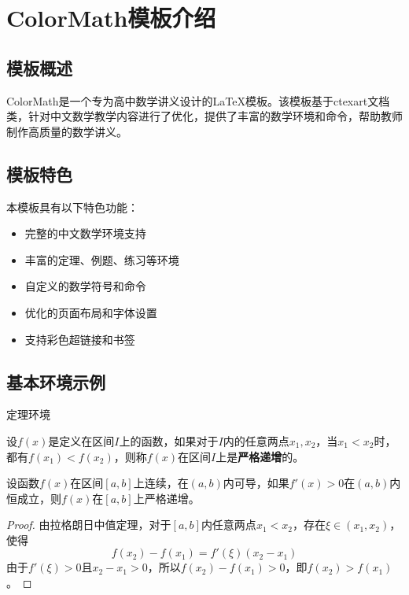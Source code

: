 \documentclass[fancy]{ColorMath} %
\begin{document}
\maketitle
\tableofcontents

\section{ColorMath模板介绍}

\subsection{模板概述}

ColorMath是一个专为高中数学讲义设计的\LaTeX{}模板。该模板基于ctexart文档类，针对中文数学教学内容进行了优化，提供了丰富的数学环境和命令，帮助教师制作高质量的数学讲义。

\subsection{模板特色}

本模板具有以下特色功能：

\begin{itemize}
    \item 完整的中文数学环境支持
    \item 丰富的定理、例题、练习等环境
    \item 自定义的数学符号和命令
    \item 优化的页面布局和字体设置
    \item 支持彩色超链接和书签
\end{itemize}

\subsection{基本环境示例}

{定理环境}

\begin{definition}
    设$f(x)$是定义在区间$I$上的函数，如果对于$I$内的任意两点$x_1, x_2$，当$x_1 < x_2$时，都有$f(x_1) < f(x_2)$，则称$f(x)$在区间$I$上是\textbf{严格递增}的。
\end{definition}

\begin{theorem}
    设函数$f(x)$在区间$[a,b]$上连续，在$(a,b)$内可导，如果$f'(x) > 0$在$(a,b)$内恒成立，则$f(x)$在$[a,b]$上严格递增。
\end{theorem}

\begin{proof}
    由拉格朗日中值定理，对于$[a,b]$内任意两点$x_1 < x_2$，存在$\xi \in (x_1, x_2)$，使得
    $$f(x_2) - f(x_1) = f'(\xi)(x_2 - x_1)$$
    由于$f'(\xi) > 0$且$x_2 - x_1 > 0$，所以$f(x_2) - f(x_1) > 0$，即$f(x_2) > f(x_1)$。
\end{proof}
\end{document}
